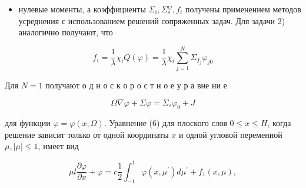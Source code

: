 \documentclass[10pt]{article}
\begin{document}
\begin{itemize}

  \item нулевые моменты, а коэффициенты $\Sigma_{i}, \Sigma_{s}^{i j}, f_{i}$ получены применением методов усреднения с использованием решений сопряженных задач. Для задачи 2) аналогично получают, что

\end{itemize}



\[

f_{i}=\frac{1}{\lambda} \chi_{i} Q(\varphi)=\frac{1}{\lambda} \chi_{i} \sum_{j=1}^{N} \Sigma_{f_{j}} \varphi_{j 0}

\]



Для $N=1$ получают о д н о с к о р о с т н о е у р а вне ни е



\[

\Omega \nabla \varphi+\Sigma \varphi=\Sigma_{s} \varphi_{0}+J

\]



для функции $\varphi=\varphi(x, \Omega)$. Уравнение (6) для плоского слоя $0 \leqslant x \leqslant H$, когда решение зависит только от одной координаты $x$ и одной угловой переменной $\mu,|\mu| \leqslant 1$, имеет вид



\[

\mu l \frac{\partial \varphi}{\partial x}+\varphi=c \frac{1}{2} \int_{-1}^{1} \varphi\left(x, \mu^{\prime}\right) d \mu^{\prime}+f_{1}(x, \mu),

\]
\end{document}
